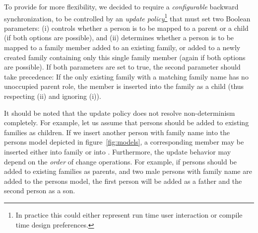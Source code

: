 To provide for more flexibility, we decided to require a \emph{configurable} backward synchronization, to be controlled by an \emph{update policy}\footnote{In practice this could either represent run time user interaction or compile time design preferences.} that must set two Boolean parameters:
(i)  controls whether a person is to be mapped to a parent or a child (if both options are possible), and (ii)  determines whether a person is to be mapped to a family member added to an existing family, or added to a newly created family containing only this single family member (again if both options are possible). 
If both parameters are set to true, the second parameter should take precedence: If the only existing family with a matching family name has no unoccupied parent role, the member is inserted into the family as a child (thus respecting (ii) and ignoring (i)).

It should be noted that the update policy does not resolve non-determinism completely.
For example, let us assume that persons should be added to existing families as children.
If we insert another person with family name  into the persons model depicted in figure~\ref{fig:models}, a corresponding member may be inserted either into family  or into .
Furthermore, the update behavior may depend on the \emph{order} of change operations. For example, if persons should be added to existing families as parents, and two male persons with family name  are added to the persons model, the first person will be added as a father and the second person as a son. 

